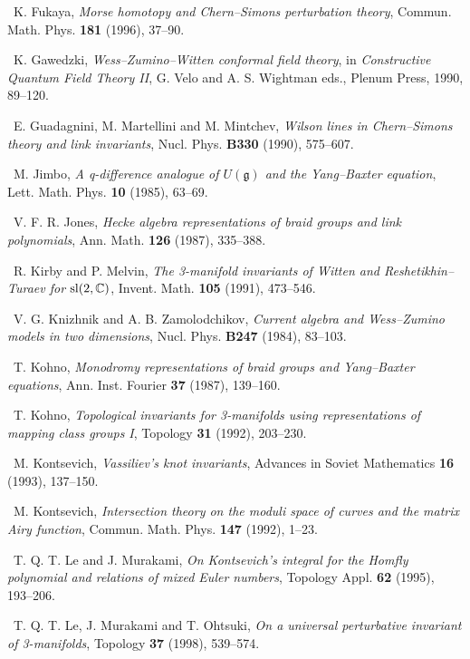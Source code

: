 \noindent [27]\ K. Fukaya, \textit{Morse homotopy and Chern--Simons perturbation theory}, Commun. Math. Phys. \textbf{181} (1996), 37--90.

\noindent [28]\ K. Gawedzki, \textit{Wess--Zumino--Witten conformal field theory}, in \textit{Constructive Quantum Field Theory II}, G. Velo and A. S. Wightman eds., Plenum Press, 1990, 89--120.

\noindent [29]\ E. Guadagnini, M. Martellini and M. Mintchev, \textit{Wilson lines in Chern--Simons theory and link invariants}, Nucl. Phys. \textbf{B330} (1990), 575--607.

\noindent [30]\ M. Jimbo, \textit{A q-difference analogue of $U(\mathfrak{g})$ and the Yang--Baxter equation}, Lett. Math. Phys. \textbf{10} (1985), 63--69.

\noindent [31]\ V. F. R. Jones, \textit{Hecke algebra representations of braid groups and link polynomials}, Ann. Math. \textbf{126} (1987), 335--388.

\noindent [32]\ R. Kirby and P. Melvin, \textit{The 3-manifold invariants of Witten and Reshetikhin--Turaev for $\mathrm{sl}(2,\mathbb{C})$}, Invent. Math. \textbf{105} (1991), 473--546.

\noindent [33]\ V. G. Knizhnik and A. B. Zamolodchikov, \textit{Current algebra and Wess--Zumino models in two dimensions}, Nucl. Phys. \textbf{B247} (1984), 83--103.

\noindent [34]\ T. Kohno, \textit{Monodromy representations of braid groups and Yang--Baxter equations}, Ann. Inst. Fourier \textbf{37} (1987), 139--160.

\noindent [35]\ T. Kohno, \textit{Topological invariants for 3-manifolds using representations of mapping class groups I}, Topology \textbf{31} (1992), 203--230.

\noindent [36]\ M. Kontsevich, \textit{Vassiliev's knot invariants}, Advances in Soviet Mathematics \textbf{16} (1993), 137--150.

\noindent [37]\ M. Kontsevich, \textit{Intersection theory on the moduli space of curves and the matrix Airy function}, Commun. Math. Phys. \textbf{147} (1992), 1--23.

\noindent [38]\ T. Q. T. Le and J. Murakami, \textit{On Kontsevich's integral for the Homfly polynomial and relations of mixed Euler numbers}, Topology Appl. \textbf{62} (1995), 193--206.

\noindent [39]\ T. Q. T. Le, J. Murakami and T. Ohtsuki, \textit{On a universal perturbative invariant of 3-manifolds}, Topology \textbf{37} (1998), 539--574.

